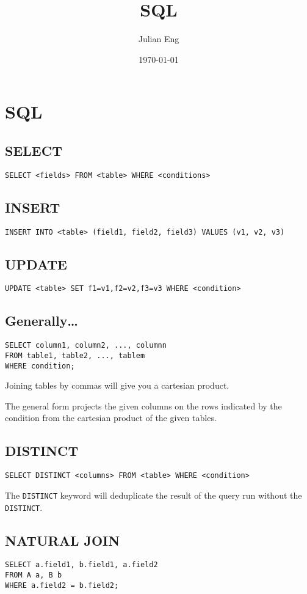 \documentclass[11pt]{article}
\author{Julian Eng}
\date{\today}
\title{SQL}
\begin{document}
\maketitle
\tableofcontents

\section{SQL}
\label{sec:org5db7974}
\subsection{SELECT}
\label{sec:org0035aa1}
\texttt{SELECT <fields> FROM <table> WHERE <conditions>}
\subsection{INSERT}
\label{sec:org52bf0ea}
\texttt{INSERT INTO <table> (field1, field2, field3) VALUES (v1, v2, v3)}
\subsection{UPDATE}
\label{sec:org94ab9c5}
\texttt{UPDATE <table> SET f1=v1,f2=v2,f3=v3 WHERE <condition>}
\subsection{Generally\ldots{}}
\label{sec:org4721477}
\begin{verbatim}
SELECT column1, column2, ..., columnn
FROM table1, table2, ..., tablem
WHERE condition;
\end{verbatim}

Joining tables by commas will give you a cartesian product.

The general form projects the given columns on the rows indicated by the
condition from the cartesian product of the given tables.
\subsection{DISTINCT}
\label{sec:orge313d34}
\texttt{SELECT DISTINCT <columns> FROM <table> WHERE <condition>}

The \texttt{DISTINCT} keyword will deduplicate the result of the query run without
the \texttt{DISTINCT}.
\subsection{NATURAL JOIN}
\label{sec:org95703e0}
\begin{verbatim}
SELECT a.field1, b.field1, a.field2
FROM A a, B b
WHERE a.field2 = b.field2;
\end{verbatim}
\end{document}
